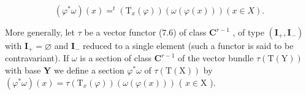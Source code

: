 \[
(\varphi^ {*} \omega) (x) = ^ {t} (\mathrm{T} _ {x} (\varphi)) (\omega (\varphi (x))) (x \in X).
\]

More generally, let \(\tau\) be a vector functor (7.6) of class \(\mathbf{C}^{r-1}\) , of type \((\mathbf{I}_{+}, \mathbf{I}_{-})\) with \(\mathbf{I}_{+} = \varnothing\) and \(\mathbf{I}_{-}\) reduced to a single element (such a functor is said to be contravariant). If \(\omega\) is a section of class \(\mathbf{C}^{r-1}\) of the vector bundle \(\tau(\mathrm{T}(\mathrm{Y}))\) with base \(\mathbf{Y}\) we define a section \(\varphi^{*}\omega\) of \(\tau(\mathrm{T}(\mathrm{X}))\) by \((\varphi^{*}\omega)(x) = \tau(\mathrm{T}_{x}(\varphi))(\omega(\varphi(x)))\) ( \(x \in \mathrm{X}\) ).
\relax{}
